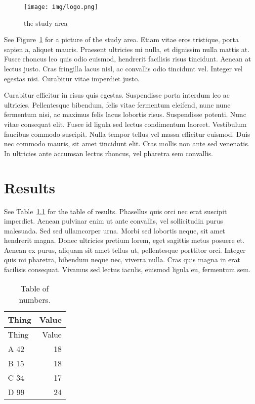 \documentclass[
  oneside,
  open=any]{scrbook}
\begin{document}
\begin{figure}

{\centering \texttt{[image: img/logo.png]}

}

\caption{\label{fig-logo}the study area}

\end{figure}

See Figure~\ref{fig-logo} for a picture of the study area. Etiam vitae
eros tristique, porta sapien a, aliquet mauris. Praesent ultricies mi
nulla, et dignissim nulla mattis at. Fusce rhoncus leo quis odio
euismod, hendrerit facilisis risus tincidunt. Aenean at lectus justo.
Cras fringilla lacus nisl, ac convallis odio tincidunt vel. Integer vel
egestas nisi. Curabitur vitae imperdiet justo.

Curabitur efficitur in risus quis egestas. Suspendisse porta interdum
leo ac ultricies. Pellentesque bibendum, felis vitae fermentum eleifend,
nunc nunc fermentum nisi, ac maximus felis lacus lobortis risus.
Suspendisse potenti. Nunc vitae consequat elit. Fusce id ligula sed
lectus condimentum laoreet. Vestibulum faucibus commodo suscipit. Nulla
tempor tellus vel massa efficitur euismod. Duis nec commodo mauris, sit
amet tincidunt elit. Cras mollis non ante sed venenatis. In ultricies
ante accumsan lectus rhoncus, vel pharetra sem convallis.

\hypertarget{results}{%
\chapter{Results}\label{results}}

See Table~\ref{tbl-numbers} for the table of results. Phasellus quis
orci nec erat suscipit imperdiet. Aenean pulvinar enim ut ante
convallis, vel sollicitudin purus malesuada. Sed sed ullamcorper urna.
Morbi sed lobortis neque, sit amet hendrerit magna. Donec ultricies
pretium lorem, eget sagittis metus posuere et. Aenean ex purus, aliquam
sit amet tellus ut, pellentesque porttitor orci. Integer quis mi
pharetra, bibendum neque nec, viverra nulla. Cras quis magna in erat
facilisis consequat. Vivamus sed lectus iaculis, euismod ligula eu,
fermentum sem.

\hypertarget{tbl-numbers}{}
\begin{longtable}[]{@{}lr@{}}
\caption{\label{tbl-numbers}Table of numbers.}\tabularnewline
\toprule()
Thing & Value \\
\midrule()
\endfirsthead
\toprule()
Thing & Value \\
\midrule()
\endhead
A 42 & 18 \\
B 15 & 18 \\
C 34 & 17 \\
D 99 & 24 \\
\bottomrule()
\end{longtable}
\end{document}
